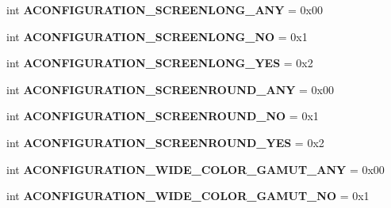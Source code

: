 \begin{DoxyCompactItemize}
\item 
\mbox{\label{classconfiguration_1_1AConfiguration_a7de9093c9219ae4e381d4abf5cbfe10e}} 
int {\bfseries A\+C\+O\+N\+F\+I\+G\+U\+R\+A\+T\+I\+O\+N\+\_\+\+S\+C\+R\+E\+E\+N\+L\+O\+N\+G\+\_\+\+A\+NY} = 0x00
\item 
\mbox{\label{classconfiguration_1_1AConfiguration_a8e66c2a5acdfda0b30f25df4c57701c0}} 
int {\bfseries A\+C\+O\+N\+F\+I\+G\+U\+R\+A\+T\+I\+O\+N\+\_\+\+S\+C\+R\+E\+E\+N\+L\+O\+N\+G\+\_\+\+NO} = 0x1
\item 
\mbox{\label{classconfiguration_1_1AConfiguration_ab6e78c905d410d099f53ae6e5ea71ec1}} 
int {\bfseries A\+C\+O\+N\+F\+I\+G\+U\+R\+A\+T\+I\+O\+N\+\_\+\+S\+C\+R\+E\+E\+N\+L\+O\+N\+G\+\_\+\+Y\+ES} = 0x2
\item 
\mbox{\label{classconfiguration_1_1AConfiguration_a96b2dee66fdba7f1728ecac0d9b333a9}} 
int {\bfseries A\+C\+O\+N\+F\+I\+G\+U\+R\+A\+T\+I\+O\+N\+\_\+\+S\+C\+R\+E\+E\+N\+R\+O\+U\+N\+D\+\_\+\+A\+NY} = 0x00
\item 
\mbox{\label{classconfiguration_1_1AConfiguration_a45ef3d90ca4ce4c2618c0ab2ab2e94f7}} 
int {\bfseries A\+C\+O\+N\+F\+I\+G\+U\+R\+A\+T\+I\+O\+N\+\_\+\+S\+C\+R\+E\+E\+N\+R\+O\+U\+N\+D\+\_\+\+NO} = 0x1
\item 
\mbox{\label{classconfiguration_1_1AConfiguration_a4d8418ddd45d352a1f8fdef310afd805}} 
int {\bfseries A\+C\+O\+N\+F\+I\+G\+U\+R\+A\+T\+I\+O\+N\+\_\+\+S\+C\+R\+E\+E\+N\+R\+O\+U\+N\+D\+\_\+\+Y\+ES} = 0x2
\item 
\mbox{\label{classconfiguration_1_1AConfiguration_a6aa5137a1436ac37b31c6c011b802946}} 
int {\bfseries A\+C\+O\+N\+F\+I\+G\+U\+R\+A\+T\+I\+O\+N\+\_\+\+W\+I\+D\+E\+\_\+\+C\+O\+L\+O\+R\+\_\+\+G\+A\+M\+U\+T\+\_\+\+A\+NY} = 0x00
\item 
\mbox{\label{classconfiguration_1_1AConfiguration_afdc04e9c6fa37c65e9fb1be190f9af19}} 
int {\bfseries A\+C\+O\+N\+F\+I\+G\+U\+R\+A\+T\+I\+O\+N\+\_\+\+W\+I\+D\+E\+\_\+\+C\+O\+L\+O\+R\+\_\+\+G\+A\+M\+U\+T\+\_\+\+NO} = 0x1

\end{DoxyCompactItemize}
